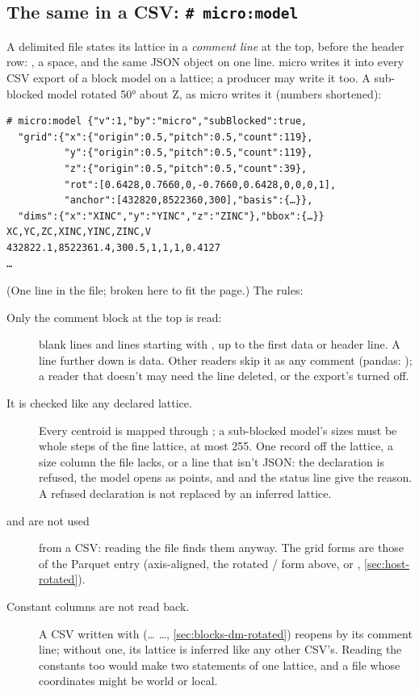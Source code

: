 \subsection{The same in a CSV: \texttt{\# micro:model}}\label{sec:host-csv-model}

A delimited file states its lattice in a \emph{comment line} at the top, before the header row:
, a space, and the same JSON object on one line. micro writes it into every
CSV export of a block model on a lattice; a producer may write it too. A sub-blocked model rotated
50° about Z, as micro writes it (numbers shortened):

\begin{lstlisting}
# micro:model {"v":1,"by":"micro","subBlocked":true,
  "grid":{"x":{"origin":0.5,"pitch":0.5,"count":119},
          "y":{"origin":0.5,"pitch":0.5,"count":119},
          "z":{"origin":0.5,"pitch":0.5,"count":39},
          "rot":[0.6428,0.7660,0,-0.7660,0.6428,0,0,0,1],
          "anchor":[432820,8522360,300],"basis":{…}},
  "dims":{"x":"XINC","y":"YINC","z":"ZINC"},"bbox":{…}}
XC,YC,ZC,XINC,YINC,ZINC,V
432822.1,8522361.4,300.5,1,1,1,0.4127
…
\end{lstlisting}

(One line in the file; broken here to fit the page.) The rules:

\begin{description}
\item[Only the comment block at the top is read:] blank lines and lines starting with \code{\#},
  up to the first data or header line. A  line further down is data. Other
  readers skip it as any comment (pandas: ); a reader that doesn't may need the
  line deleted, or the export's  turned off.
\item[It is checked like any declared lattice.] Every centroid is mapped through ; a
  sub-blocked model's sizes must be whole steps of the fine lattice, at most 255. One record off
  the lattice, a size column the file lacks, or a line that isn't JSON: the declaration is
  refused, the model opens as points, and  and the status line give
  the reason. A refused declaration is not replaced by an inferred lattice.
\item[ and  are not used] from a CSV: reading the file finds them
  anyway. The grid forms are those of the Parquet entry (axis-aligned, the rotated
  / form above, or , \cref{sec:host-rotated}).
\item[Constant columns are not read back.] A CSV written with 
  (…  …, \cref{sec:blocks-dm-rotated}) reopens by its comment line;
  without one, its lattice is inferred like any other CSV's. Reading the constants too would make
  two statements of one lattice, and a file whose coordinates might be world or local.
\end{description}

